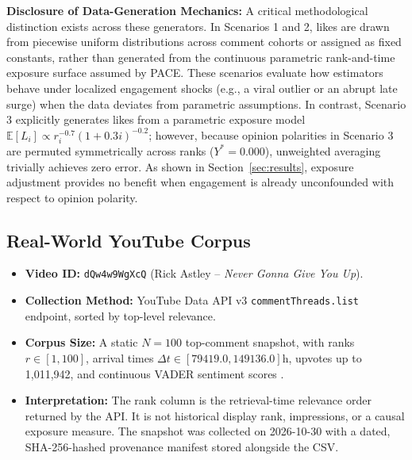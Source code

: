 \documentclass[journal]{IEEEtran}
\begin{document}
\noindent\textbf{Disclosure of Data-Generation Mechanics:} 
A critical methodological distinction exists across these generators. In Scenarios 1 and 2, likes are drawn from piecewise uniform distributions across comment cohorts or assigned as fixed constants, rather than generated from the continuous parametric rank-and-time exposure surface assumed by PACE. These scenarios evaluate how estimators behave under localized engagement shocks (e.g., a viral outlier or an abrupt late surge) when the data deviates from parametric assumptions. In contrast, Scenario 3 explicitly generates likes from a parametric exposure model $\mathbb{E}[L_i] \propto r_i^{-0.7} (1 + 0.3i)^{-0.2}$; however, because opinion polarities in Scenario 3 are permuted symmetrically across ranks ($Y^* = 0.000$), unweighted averaging trivially achieves zero error. As shown in Section~\ref{sec:results}, exposure adjustment provides no benefit when engagement is already unconfounded with respect to opinion polarity.

\subsection{Real-World YouTube Corpus}
\begin{itemize}
    \item \textbf{Video ID:} \texttt{dQw4w9WgXcQ} (Rick Astley -- \textit{Never Gonna Give You Up}).
    \item \textbf{Collection Method:} YouTube Data API v3 \texttt{commentThreads.list} endpoint, sorted by top-level relevance.
    \item \textbf{Corpus Size:} A static $N = 100$ top-comment snapshot, with ranks $r \in [1, 100]$, arrival times $\Delta t \in [79419.0, 149136.0]\text{h}$, upvotes up to 1,011,942, and continuous VADER sentiment scores \cite{hutto2014vader}.
    \item \textbf{Interpretation:} The rank column is the retrieval-time relevance order returned by the API. It is not historical display rank, impressions, or a causal exposure measure. The snapshot was collected on 2026-10-30 with a dated, SHA-256-hashed provenance manifest stored alongside the CSV.
\end{itemize}
\end{document}
